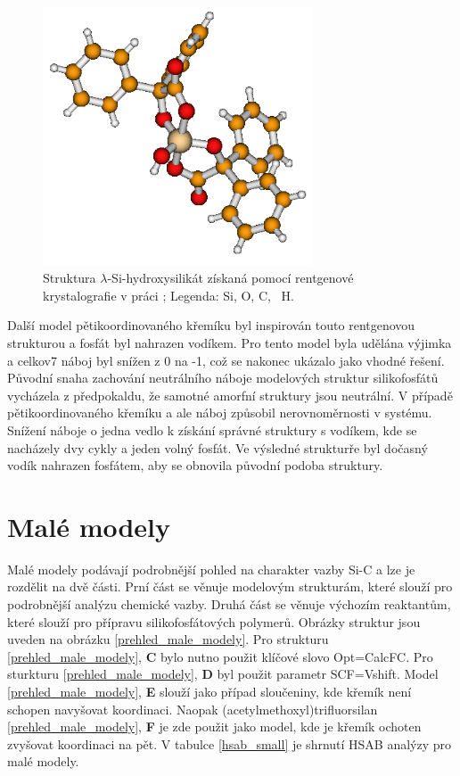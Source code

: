 \documentclass[
digital, %
table,   %
lof,     %
lot,     %
oneside,
]{fithesis3}
\begin{document}
\begin{figure}\begin{minipage}{\textwidth}
\begin{center}
\includegraphics[width=8cm]{rtg_5_koordinace.png}
\caption{Struktura $\lambda$-Si-hydroxysilikát získaná pomocí rentgenové krystalografie v práci \cite{rtg_5};  Legenda:  Si,  O,  C, ~H.}
\label{rtg_5}
\end{center}\end{minipage}
\end{figure}
Další model pětikoordinovaného křemíku byl inspirován touto rentgenovou strukturou a fosfát byl nahrazen vodíkem. Pro tento model byla udělána výjimka a celkov7 náboj byl snížen z 0 na -1, což se nakonec ukázalo jako vhodné řešení. Původní snaha zachování neutrálního náboje modelových struktur silikofosfátů vycházela z předpokaldu, že samotné amorfní struktury jsou neutrální. V případě pětikoordinovaného křemíku a ale náboj způsobil nerovnoměrnosti v systému. Snížení náboje o jedna vedlo k získání správné struktury s vodíkem, kde se nacházely dvy cykly a jeden volný fosfát. Ve výsledné strukturře byl dočasný vodík nahrazen fosfátem, aby se obnovila původní podoba struktury.

\section{Malé modely}
Malé modely podávají podrobnější pohled na charakter vazby Si-C a lze je rozdělit na dvě části. Prní část se věnuje modelovým strukturám, které slouží pro podrobnější analýzu chemické vazby. Druhá část se věnuje výchozím reaktantům, které slouží pro přípravu silikofosfátových polymerů. Obrázky struktur jsou uveden na obrázku \ref{prehled_male_modely}. Pro strukturu  \ref{prehled_male_modely}, \textbf{C} bylo nutno použit klíčové slovo Opt=CalcFC. Pro sturkturu  \ref{prehled_male_modely},  \textbf{D} byl použit parametr SCF=Vshift. Model  \ref{prehled_male_modely}, \textbf{E} slouží jako případ sloučeniny, kde křemík není schopen navyšovat koordinaci. Naopak (acetylmethoxyl)trifluorsilan \ref{prehled_male_modely}, \textbf{F} je zde použit jako model, kde je křemík ochoten zvyšovat koordinaci na pět. V tabulce \ref{hsab_small} je shrnutí HSAB analýzy pro malé modely.
\end{document}
